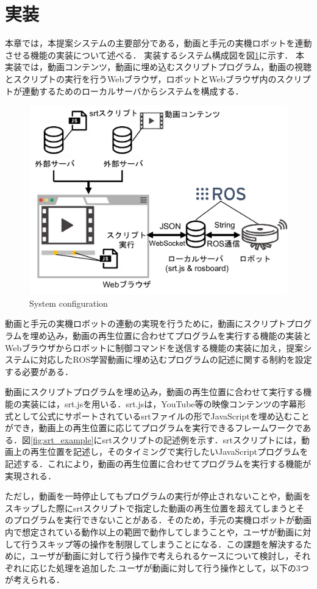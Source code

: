 \documentclass{ujarticle}
\begin{document}
\section{実装}
本章では，本提案システムの主要部分である，動画と手元の実機ロボットを連動させる機能の実装について述べる．
実装するシステム構成図を図\ref{fig:Implemented_system}に示す．
本実装では，動画コンテンツ，動画に埋め込むスクリプトプログラム，動画の視聴とスクリプトの実行を行うWebブラウザ，ロボットとWebブラウザ内のスクリプトが連動するためのローカルサーバからシステムを構成する．

\begin{figure}[t]
  \centering
  \includegraphics[keepaspectratio, scale=0.4]{./src/Implemented_system.pdf}
  \caption{System configuration}
  \label{fig:Implemented_system}
\end{figure}

\par 動画と手元の実機ロボットの連動の実現を行うために，動画にスクリプトプログラムを埋め込み，動画の再生位置に合わせてプログラムを実行する機能の実装とWebブラウザからロボットに制御コマンドを送信する機能の実装に加え，提案システムに対応したROS学習動画に埋め込むプログラムの記述に関する制約を設定する必要がある．
\par 動画にスクリプトプログラムを埋め込み，動画の再生位置に合わせて実行する機能の実装には，srt.js\cite{srt.js}を用いる．srt.jsは，YouTube等の映像コンテンツの字幕形式として公式にサポートされているsrtファイルの形でJavaScriptを埋め込むことができ，動画上の再生位置に応じてプログラムを実行できるフレームワークである．図\ref{fig:srt_example}にsrtスクリプトの記述例を示す．srtスクリプトには，動画上の再生位置を記述し，そのタイミングで実行したいJavaScriptプログラムを記述する．これにより，動画の再生位置に合わせてプログラムを実行する機能が実現される．
\par ただし，動画を一時停止してもプログラムの実行が停止されないことや，動画をスキップした際にsrtスクリプトで指定した動画の再生位置を超えてしまうとそのプログラムを実行できないことがある．そのため，手元の実機ロボットが動画内で想定されている動作以上の範囲で動作してしまうことや，ユーザが動画に対して行うスキップ等の操作を制限してしまうことになる．この課題を解決するために，ユーザが動画に対して行う操作で考えられるケースについて検討し，それぞれに応じた処理を追加した.ユーザが動画に対して行う操作として，以下の3つが考えられる．
\end{document}
